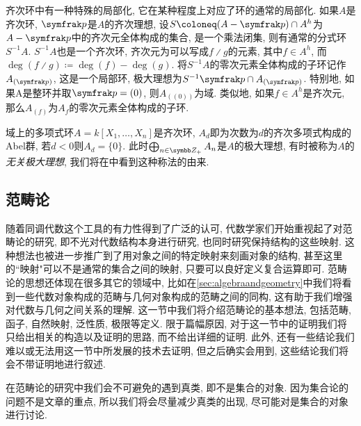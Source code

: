 齐次环中有一种特殊的局部化, 它在某种程度上对应了环的通常的局部化. 如果$A$是齐次环, $\ideal{p}$是$A$的齐次理想, 设$S\coloneq (A-\ideal{p})\cap A^h$为$A-\ideal{p}$中的齐次元全体构成的集合, 是一个乘法闭集, 则有通常的分式环$S^{-1}A$. $S^{-1}A$也是一个齐次环, 齐次元为可以写成$f{\divslash}g$的元素, 其中$f\in A^h$, 而$\deg (f{\divslash}g)\coloneq \deg (f)-\deg (g)$. 将$S^{-1}A$的零次元素全体构成的子环记作$A_{(\ideal{p})}$, 这是一个局部环, 极大理想为$S^{-1}\ideal{p}\cap A_{(\ideal{p})}$. 特别地, 如果A是整环并取$\ideal{p}=(0)$, 则$A_{((0))}$为域. 类似地, 如果$f\in A^h$是齐次元, 那么$A_{(f)}$为$A_f$的零次元素全体构成的子环.

\begin{example}
  域上的多项式环$A=k[X_1, \dotsc, X_n]$是齐次环, $A_d$即为次数为$d$的齐次多项式构成的Abel群, 若$d<0$则$A_d=\{0\}$. 此时$\bigoplus_{n\in\ZZ_+}A_n$是$A$的极大理想, 有时被称为$A$的\emph{无关极大理想}, 我们将在中看到这种称法的由来.
\end{example}


\subsection{范畴论}

随着同调代数这个工具的有力性得到了广泛的认可, 代数学家们开始重视起了对范畴论的研究, 即不光对代数结构本身进行研究, 也同时研究保持结构的这些映射. 这种想法也被进一步推广到了用对象之间的特定映射来刻画对象的结构, 甚至这里的``映射"可以不是通常的集合之间的映射, 只要可以良好定义复合运算即可. 范畴论的思想还体现在很多其它的领域中, 比如在\ref{sec:algebraandgeometry}中我们将看到一些代数对象构成的范畴与几何对象构成的范畴之间的同构, 这有助于我们增强对代数与几何之间关系的理解. 这一节中我们将介绍范畴论的基本想法, 包括范畴, 函子, 自然映射, 泛性质, 极限等定义. 限于篇幅原因, 对于这一节中的证明我们将只给出相关的构造以及证明的思路, 而不给出详细的证明. 此外, 还有一些结论我们难以或无法用这一节中所发展的技术去证明, 但之后确实会用到, 这些结论我们将会不带证明地进行叙述.

在范畴论的研究中我们会不可避免的遇到真类, 即不是集合的对象. 因为集合论的问题不是文章的重点, 所以我们将会尽量减少真类的出现, 尽可能对是集合的对象进行讨论.

